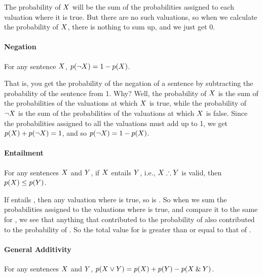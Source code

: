 The probability of $X$ will be the sum of the probabilities assigned to each valuation where it is true. But there are no such valuations, so when we calculate the probability of $X$, there is nothing to sum up, and we just get 0.

\paragraph{Negation}
 For any sentence $X$, $p(\neg X) = 1 - p(X)$.

That is, you get the probability of the negation of a sentence by subtracting the probability of the sentence from 1. Why? Well, the probability of $X$ is the sum of the probabilities of the valuations at which $X$ is true, while the probability of $\neg X$ is the sum of the probabilities of the valuations at which $X$ is false. Since the probabilities assigned to all the valuations must add up to 1, we get $p(X) + p(\neg X) = 1$, and so $p(\neg X) = 1 - p(X)$.

\paragraph{Entailment} For any sentences $X$ and $Y$, if $X$ entails $Y$, i.e., $\metaX\therefore\metaY$ is valid, then $p(X)\leq p(Y)$. 

If \metaX entails \metaY, then any valuation where \metaX is true, so is \metaY. So when we sum the probabilities assigned to the valuations where \metaX is true, and compare it to the same for \metaY, we see that anything that contributed to the probability of \metaX also contributed to the probability of \metaY. So the total value for \metaY is greater than or equal to that of \metaX.

%

\paragraph{General Additivity} For any sentences $X$ and $Y$, $p(X \vee Y) = p(X) + p(Y) - p(X\mathbin{\&} Y)$. 

